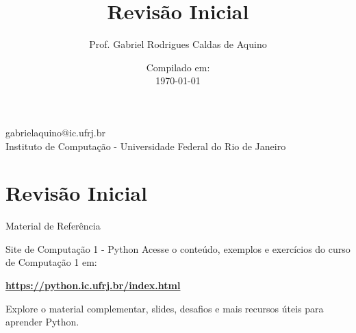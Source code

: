 \title{Revisão Inicial}

\author{Prof. Gabriel Rodrigues Caldas de Aquino}

\institute
{
    gabrielaquino@ic.ufrj.br\\

    Instituto de Computação -
    Universidade Federal do Rio de Janeiro %
}
\date{Compilado em: \\ \today} %


\section{Revisão Inicial}

\begin{frame}
    \titlepage
\end{frame}

\begin{frame}{Material de Referência}

    \begin{block}{Site de Computação 1 - Python}
        Acesse o conteúdo, exemplos e exercícios do curso de Computação 1 em:

        \centering
        \href{https://python.ic.ufrj.br/index.html}{\textbf{https://python.ic.ufrj.br/index.html}}

        \vspace{1em}

        Explore o material complementar, slides, desafios e mais recursos úteis para aprender Python.
    \end{block}

\end{frame}



